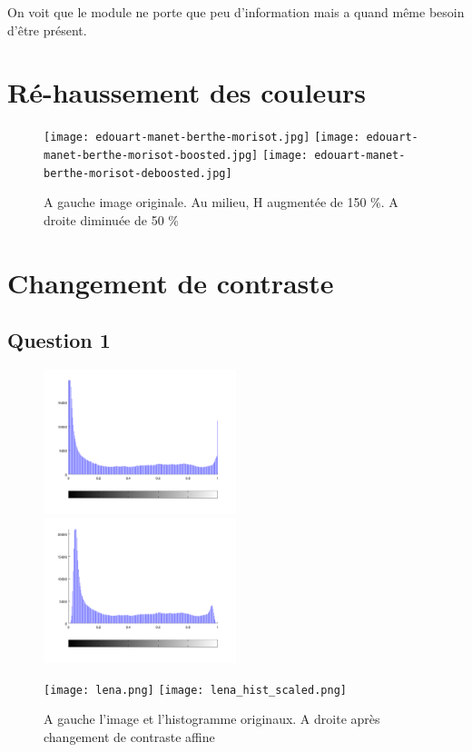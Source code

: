 \documentclass{article}
\begin{document}
On voit que le module ne porte que peu d'information mais a quand même besoin d'être présent. 

\newpage

\section{Ré-haussement des couleurs}


\begin{figure}[h]

	\texttt{[image: edouart-manet-berthe-morisot.jpg]}
	\texttt{[image: edouart-manet-berthe-morisot-boosted.jpg]}
	\texttt{[image: edouart-manet-berthe-morisot-deboosted.jpg]}
  \caption{A gauche image originale. Au milieu, H augmentée de 150 \%. A droite diminuée de 50 \%}
\end{figure}

\newpage

\section{Changement de contraste}

\subsection*{Question 1}

\begin{figure}[h]

	\includegraphics[width=0.5\textwidth]{hist_orig.png}
	\includegraphics[width=0.5\textwidth]{hist_scaled.png}
		
	\texttt{[image: lena.png]}
	\texttt{[image: lena\_hist\_scaled.png]}
		
	\caption{A gauche l'image et l'histogramme originaux. A droite après changement de contraste affine}
	
\end{figure}
\end{document}
